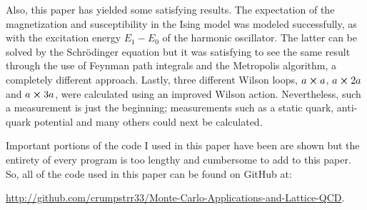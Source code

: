 \documentclass[11pt]{article}
\begin{document}
Also, this paper has yielded some satisfying results. The expectation of the magnetization and susceptibility in the Ising model was modeled successfully, as with the excitation energy $E_1-E_0$ of the harmonic oscillator. The latter can be solved by the Schr\"odinger equation but it was satisfying to see the same result through the use of Feynman path integrals and the Metropolis algorithm, a completely different approach. Lastly, three different Wilson loops, $a\cross a$, $a\cross2a$ and $a\cross3a$, were calculated using an improved Wilson action. Nevertheless, such a measurement is just the beginning; measurements such as a static quark, anti-quark potential and many others could next be calculated.

Important portions of the code I used in this paper have been are shown but the entirety of every program is too lengthy and cumbersome to add to this paper. So, all of the code used in this paper can be found on GitHub at:

\url{http://github.com/crumpstrr33/Monte-Carlo-Applications-and-Lattice-QCD}.

\break


\end{document}
